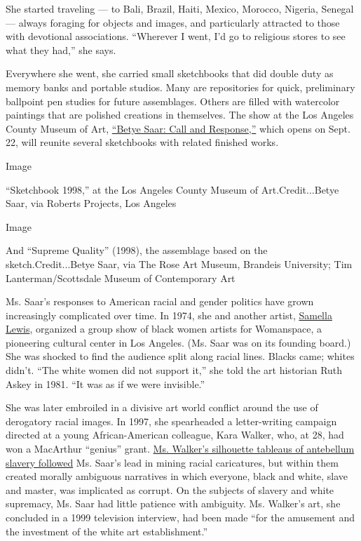 She started traveling --- to Bali, Brazil, Haiti, Mexico, Morocco,
Nigeria, Senegal --- always foraging for objects and images, and
particularly attracted to those with devotional associations. ``Wherever
I went, I'd go to religious stores to see what they had,'' she says.

Everywhere she went, she carried small sketchbooks that did double duty
as memory banks and portable studios. Many are repositories for quick,
preliminary ballpoint pen studies for future assemblages. Others are
filled with watercolor paintings that are polished creations in
themselves. The show at the Los Angeles County Museum of Art,
\href{https://www.lacma.org/art/exhibition/betye-saar-call-and-response}{``Betye
Saar: Call and Response,''} which opens on Sept. 22, will reunite
several sketchbooks with related finished works.

Image

``Sketchbook 1998,'' at the Los Angeles County Museum of
Art.Credit...Betye Saar, via Roberts Projects, Los Angeles

Image

And ``Supreme Quality'' (1998), the assemblage based on the
sketch.Credit...Betye Saar, via The Rose Art Museum, Brandeis
University; Tim Lanterman/Scottsdale Museum of Contemporary Art

Ms. Saar's responses to American racial and gender politics have grown
increasingly complicated over time. In 1974, she and another artist,
\href{https://hammer.ucla.edu/now-dig-this/artists/samella-lewis/}{Samella
Lewis}, organized a group show of black women artists for Womanspace, a
pioneering cultural center in Los Angeles. (Ms. Saar was on its founding
board.) She was shocked to find the audience split along racial lines.
Blacks came; whites didn't. ``The white women did not support it,'' she
told the art historian Ruth Askey in 1981. ``It was as if we were
invisible.''

She was later embroiled in a divisive art world conflict around the use
of derogatory racial images. In 1997, she spearheaded a letter-writing
campaign directed at a young African-American colleague, Kara Walker,
who, at 28, had won a MacArthur ``genius'' grant.
\href{https://editions.lib.umn.edu/panorama/article/kara-walkers-about-the-title-the-ghostly-presence-of-transgenerational-trauma-as-a-connective-tissue-between-the-past-and-present/}{Ms.
Walker's silhouette tableaus of antebellum slavery followed} Ms. Saar's
lead in mining racial caricatures, but within them created morally
ambiguous narratives in which everyone, black and white, slave and
master, was implicated as corrupt. On the subjects of slavery and white
supremacy, Ms. Saar had little patience with ambiguity. Ms. Walker's
art, she concluded in a 1999 television interview, had been made ``for
the amusement and the investment of the white art establishment.''

